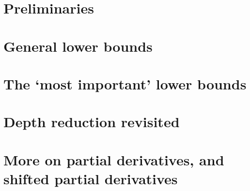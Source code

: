 \onehalfspace





\tableofcontents



\part{Preliminaries}









%



\part{General lower bounds}









\part{The `most important' lower bounds}

















\part{Depth reduction revisited}



\part{More on partial derivatives, and shifted partial derivatives}

